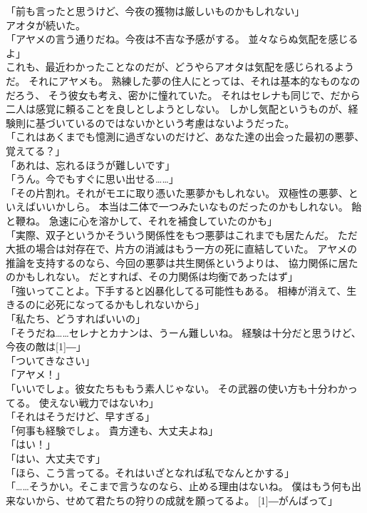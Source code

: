 \documentclass[../IHMain]{subfiles}
\begin{document}
「前も言ったと思うけど、今夜の獲物は厳しいものかもしれない」\\
アオタが続いた。\\
「アヤメの言う通りだね。今夜は不吉な予感がする。
並々ならぬ気配を感じるよ」\\
これも、最近わかったことなのだが、どうやらアオタは気配を感じられるようだ。
それにアヤメも。
熟練した夢の住人にとっては、それは基本的なものなのだろう、
そう彼女も考え、密かに憧れていた。
それはセレナも同じで、だから二人は感覚に頼ることを良しとしようとしない。
しかし気配というものが、経験則に基づいているのではないかという考慮はないようだった。\\
「これはあくまでも憶測に過ぎないのだけど、あなた達の出会った最初の悪夢、覚えてる？」\\
「あれは、忘れるほうが難しいです」\\
「うん。今でもすぐに思い出せる……」\\
「その片割れ。それがモエに取り憑いた悪夢かもしれない。
双極性の悪夢、といえばいいかしら。
本当は二体で一つみたいなものだったのかもしれない。
飴と鞭ね。
急速に心を溶かして、それを補食していたのかも」\\
「実際、双子というかそういう関係性をもつ悪夢はこれまでも居たんだ。
ただ大抵の場合は対存在で、片方の消滅はもう一方の死に直結していた。
アヤメの推論を支持するのなら、今回の悪夢は共生関係というよりは、
協力関係に居たのかもしれない。
だとすれば、その力関係は均衡であったはず」\\
「強いってことよ。下手すると凶暴化してる可能性もある。
相棒が消えて、生きるのに必死になってるかもしれないから」\\
「私たち、どうすればいいの」\\
「そうだね……セレナとカナンは、うーん難しいね。
経験は十分だと思うけど、今夜の敵は\scalebox{3}[1]{―}」\\
「ついてきなさい」\\
「アヤメ！」\\
「いいでしょ。彼女たちももう素人じゃない。
その武器の使い方も十分わかってる。
使えない戦力ではないわ」\\
「それはそうだけど、早すぎる」\\
「何事も経験でしょ。
貴方達も、大丈夫よね」\\
「はい！」\\
「はい、大丈夫です」\\
「ほら、こう言ってる。それはいざとなれば私でなんとかする」\\
「……そうかい。そこまで言うなのなら、止める理由はないね。
僕はもう何も出来ないから、せめて君たちの狩りの成就を願ってるよ。
\scalebox{3}[1]{―}がんばって」
\end{document}
